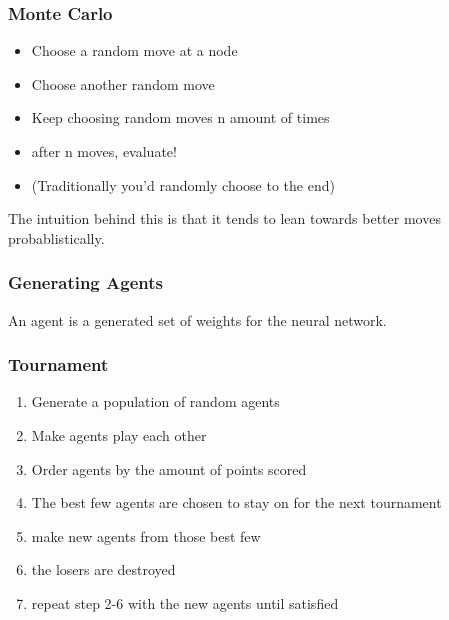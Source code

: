 \documentclass{beamer}
\begin{document}
	\begin{frame}
		\frametitle{Monte Carlo}
		\begin{itemize}
			\item Choose a random move at a node
			\item Choose another random move
			\item Keep choosing random moves n amount of times
			\item after n moves, evaluate!
			\item (Traditionally you'd randomly choose to the end)
		\end{itemize}

		The intuition behind this is that it tends to lean towards better moves probablistically.
	\end{frame}

	\begin{frame}
		\frametitle{Generating Agents}
		An agent is a generated set of weights for the neural network.
	\end{frame}

	\begin{frame}
		\frametitle{Tournament}
		\begin{enumerate}
			\item Generate a population of random agents
			\item Make agents play each other
			\item Order agents by the amount of points scored
			\item The best few agents are chosen to stay on for the next tournament
			\item make new agents from those best few
			\item the losers are destroyed
			\item repeat step 2-6 with the new agents until satisfied
		\end{enumerate}
	\end{frame}

\end{document}
